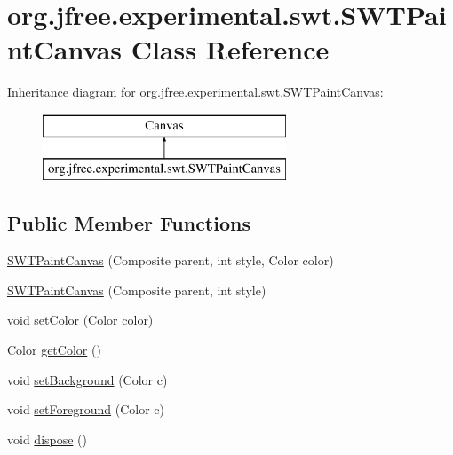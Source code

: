 \hypertarget{classorg_1_1jfree_1_1experimental_1_1swt_1_1_s_w_t_paint_canvas}{}\section{org.\+jfree.\+experimental.\+swt.\+S\+W\+T\+Paint\+Canvas Class Reference}
\label{classorg_1_1jfree_1_1experimental_1_1swt_1_1_s_w_t_paint_canvas}
Inheritance diagram for org.\+jfree.\+experimental.\+swt.\+S\+W\+T\+Paint\+Canvas\+:\begin{figure}[H]
\begin{center}
\leavevmode
\includegraphics[height=2.000000cm]{classorg_1_1jfree_1_1experimental_1_1swt_1_1_s_w_t_paint_canvas}
\end{center}
\end{figure}
\subsection*{Public Member Functions}
\begin{DoxyCompactItemize}
\item 
\mbox{\hyperlink{classorg_1_1jfree_1_1experimental_1_1swt_1_1_s_w_t_paint_canvas_aa5dfd96c094d240a0be060c9b45b066f}{S\+W\+T\+Paint\+Canvas}} (Composite parent, int style, Color color)
\item 
\mbox{\hyperlink{classorg_1_1jfree_1_1experimental_1_1swt_1_1_s_w_t_paint_canvas_a9dabc69074099fa024053fe66e5f5467}{S\+W\+T\+Paint\+Canvas}} (Composite parent, int style)
\item 
void \mbox{\hyperlink{classorg_1_1jfree_1_1experimental_1_1swt_1_1_s_w_t_paint_canvas_a6e17a8828e9bfc0b8c4240d923c42718}{set\+Color}} (Color color)
\item 
Color \mbox{\hyperlink{classorg_1_1jfree_1_1experimental_1_1swt_1_1_s_w_t_paint_canvas_a7484d1e720468dc26fc8e02c653be306}{get\+Color}} ()
\item 
void \mbox{\hyperlink{classorg_1_1jfree_1_1experimental_1_1swt_1_1_s_w_t_paint_canvas_af585038d1ae69634dac8ad7ce50523af}{set\+Background}} (Color c)
\item 
void \mbox{\hyperlink{classorg_1_1jfree_1_1experimental_1_1swt_1_1_s_w_t_paint_canvas_a38eaa27c1bac87d09352ece9a710ea31}{set\+Foreground}} (Color c)
\item 
void \mbox{\hyperlink{classorg_1_1jfree_1_1experimental_1_1swt_1_1_s_w_t_paint_canvas_ad004a93b2a4e229542e319ec805ffe86}{dispose}} ()
\end{DoxyCompactItemize}


